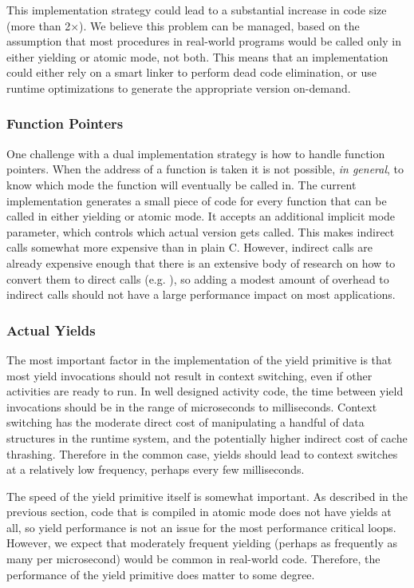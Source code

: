 \documentclass[acmsmall,anonymous,review]{acmart}\settopmatter{printfolios=true,printccs=false,printacmref=false}
\begin{document}
This implementation strategy could lead to a substantial increase in code size (more than 2$\times$).
We believe this problem can be managed, based on the assumption that most procedures in real-world programs would be called only in either yielding or atomic mode, not both.
This means that an implementation could either rely on a smart linker to perform dead code elimination, or use runtime optimizations to generate the appropriate version on-demand.


\subsubsection{Function Pointers}

One challenge with a dual implementation strategy is how to handle function pointers.
When the address of a function is taken it is not possible, \emph{in general}, to know which mode the function will eventually be called in.
The current implementation generates a small piece of code for every function that can be called in either yielding or atomic mode.
It accepts an additional implicit mode parameter, which controls which actual version gets called.
This makes indirect calls somewhat more expensive than in plain C.
However, indirect calls are already expensive enough that there is an extensive body of research on how to convert them to direct calls (e.g. \cite{Dean1995}), so adding a modest amount of overhead to indirect calls should not have a large performance impact on most applications.

\subsubsection{Actual Yields}

The most important factor in the implementation of the yield primitive is that most yield invocations should not result in context switching, even if other activities are ready to run.
In well designed activity code, the time between yield invocations should be in the range of microseconds to milliseconds.
Context switching has the moderate direct cost of manipulating a handful of data structures in the runtime system, and the potentially higher indirect cost of cache thrashing.
Therefore in the common case, yields should lead to context switches at a relatively low frequency, perhaps every few milliseconds.

The speed of the yield primitive itself is somewhat important.
As described in the previous section, code that is compiled in atomic mode does not have yields at all, so yield performance is not an issue for the most performance critical loops.
However, we expect that moderately frequent yielding (perhaps as frequently as many per microsecond) would be common in real-world code.
Therefore, the performance of the yield primitive does matter to some degree.
\end{document}
